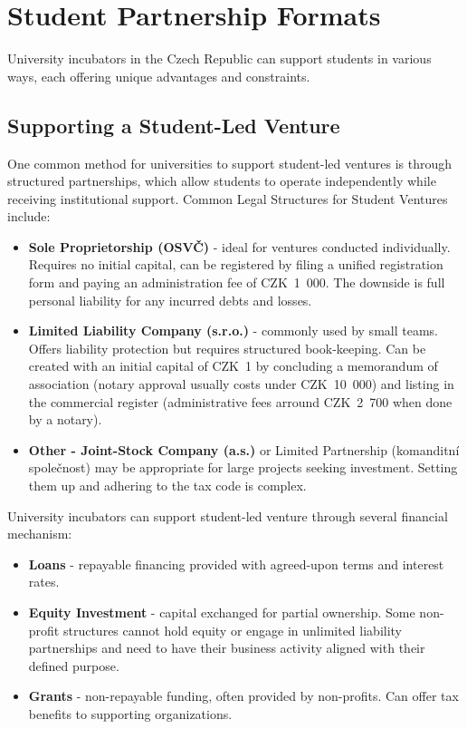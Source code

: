 \section{Student Partnership Formats}
University incubators in the Czech Republic can support students in various ways, each offering unique advantages and constraints.

\subsection{Supporting a Student-Led Venture}
\label{sec:label-supporting-student-venture}
One common method for universities to support student-led ventures is through structured partnerships, which allow students to operate independently while receiving institutional support. Common Legal Structures for Student Ventures include:
\begin{itemize}
    \item \textbf{Sole Proprietorship (OSVČ)} - ideal for ventures conducted individually. Requires no initial capital, can be registered by filing a unified registration form and paying an administration fee of CZK~1~000. The downside is full personal liability for any incurred debts and losses.
    \item \textbf{Limited Liability Company (s.r.o.)} - commonly used by small teams. Offers liability protection but requires structured book-keeping. Can be created with an initial capital of CZK~1 by concluding a memorandum of association (notary approval usually costs under CZK~10~000) and listing in the commercial register (administrative fees arround CZK~2~700 when done by a notary). 
    \item \textbf{Other - Joint-Stock Company (a.s.)} or Limited Partnership (komanditní společnost) may be appropriate for large projects seeking investment. Setting them up and adhering to the tax code is complex.
\end{itemize}

University incubators can support student-led venture through several financial mechanism:
\begin{itemize}
    \item \textbf{Loans} - repayable financing provided with agreed-upon terms and interest rates.
    \item \textbf{Equity Investment} - capital exchanged for partial ownership. Some non-profit structures cannot hold equity or engage in unlimited liability partnerships and need to have their business activity aligned with their defined purpose.
    \item \textbf{Grants} - non-repayable funding, often provided by non-profits. Can offer tax benefits to supporting organizations.
\end{itemize}

